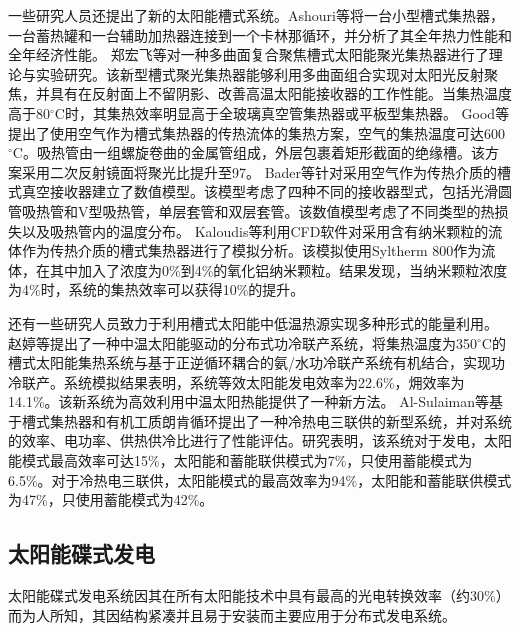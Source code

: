 一些研究人员还提出了新的太阳能槽式系统。Ashouri等\cite{Ashouri2015}将一台小型槽式集热器，一台蓄热罐和一台辅助加热器连接到一个卡林那循环，并分析了其全年热力性能和全年经济性能。
郑宏飞等\cite{Zheng2011}对一种多曲面复合聚焦槽式太阳能聚光集热器进行了理论与实验研究。该新型槽式聚光集热器能够利用多曲面组合实现对太阳光反射聚焦，并具有在反射面上不留阴影、改善高温太阳能接收器的工作性能。当集热温度高于80$\mathrm{^\circ C}$时，其集热效率明显高于全玻璃真空管集热器或平板型集热器。
Good等\cite{Good2016}提出了使用空气作为槽式集热器的传热流体的集热方案，空气的集热温度可达600$\mathrm{^\circ C}$。吸热管由一组螺旋卷曲的金属管组成，外层包裹着矩形截面的绝缘槽。该方案采用二次反射镜面将聚光比提升至97。
Bader等\cite{Bader2015}针对采用空气作为传热介质的槽式真空接收器建立了数值模型。该模型考虑了四种不同的接收器型式，包括光滑圆管吸热管和V型吸热管，单层套管和双层套管。该数值模型考虑了不同类型的热损失以及吸热管内的温度分布。
Kaloudis等\cite{Kaloudis2016}利用CFD软件对采用含有纳米颗粒的流体作为传热介质的槽式集热器进行了模拟分析。该模拟使用Syltherm 800作为流体，在其中加入了浓度为0\%到4\%的氧化铝纳米颗粒。结果发现，当纳米颗粒浓度为4\%时，系统的集热效率可以获得10\%的提升。

还有一些研究人员致力于利用槽式太阳能中低温热源实现多种形式的能量利用。
赵婷等\cite{Zhao2013}提出了一种中温太阳能驱动的分布式功冷联产系统，将集热温度为350$\mathrm{^\circ C}$的槽式太阳能集热系统与基于正逆循环耦合的氨/水功冷联产系统有机结合，实现功冷联产。系统模拟结果表明，系统等效太阳能发电效率为22.6\%，㶲效率为14.1\%。该新系统为高效利用中温太阳热能提供了一种新方法。
Al-Sulaiman等\cite{AlSulaiman2012}基于槽式集热器和有机工质朗肯循环提出了一种冷热电三联供的新型系统，并对系统的效率、电功率、供热供冷比进行了性能评估。研究表明，该系统对于发电，太阳能模式最高效率可达15\%，太阳能和蓄能联供模式为7\%，只使用蓄能模式为6.5\%。对于冷热电三联供，太阳能模式的最高效率为94\%，太阳能和蓄能联供模式为47\%，只使用蓄能模式为42\%。

\subsection{太阳能碟式发电}
\label{sec:pd}

太阳能碟式发电系统因其在所有太阳能技术中具有最高的光电转换效率（约30\%）而为人所知，其因结构紧凑并且易于安装而主要应用于分布式发电系统。


